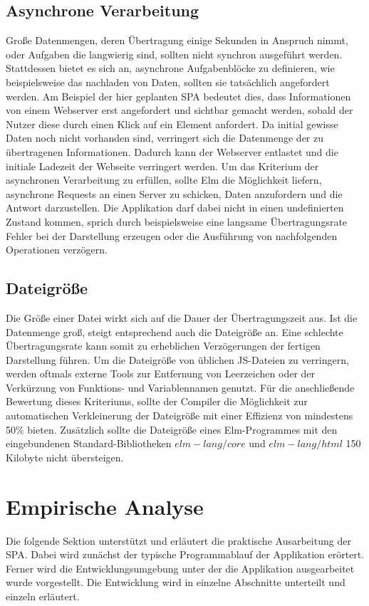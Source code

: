 \subsection{Asynchrone Verarbeitung}
\label{sec:muster_asynchrone_verarbeitung}
Große Datenmengen, deren Übertragung einige Sekunden in Anspruch nimmt, oder Aufgaben die langwierig sind, sollten nicht synchron ausgeführt werden. Stattdessen bietet es sich an, asynchrone Aufgabenblöcke zu definieren, wie beispielsweise das nachladen von Daten, sollten sie tatsächlich angefordert werden. Am Beispiel der hier geplanten \ac{SPA} bedeutet dies, dass Informationen von einem Webserver erst angefordert und sichtbar gemacht werden, sobald der Nutzer diese durch einen Klick auf ein Element anfordert. Da initial gewisse Daten noch nicht vorhanden sind, verringert sich die Datenmenge der zu übertragenen Informationen. Dadurch kann der Webserver entlastet und die initiale Ladezeit der Webseite verringert werden. Um das Kriterium der asynchronen Verarbeitung zu erfüllen, sollte Elm die Möglichkeit liefern, asynchrone Requests an einen Server zu schicken, Daten anzufordern und die Antwort darzustellen. Die Applikation darf dabei nicht in einen undefinierten Zustand kommen, sprich durch beispielsweise eine langsame Übertragungsrate Fehler bei der Darstellung erzeugen oder die Ausführung von nachfolgenden Operationen verzögern.


\subsection{Dateigröße}
\label{sec:muster_dateigroesse}
Die Größe einer Datei wirkt sich auf die Dauer der Übertragungszeit aus. Ist die Datenmenge groß, steigt entsprechend auch die Dateigröße an. Eine schlechte Übertragungsrate kann somit zu erheblichen Verzögerungen der fertigen Darstellung führen. Um die Dateigröße von üblichen \ac{JS}-Dateien zu verringern, werden oftmals externe Tools zur Entfernung von Leerzeichen oder der Verkürzung von Funktions- und Variablennamen genutzt. Für die anschließende Bewertung dieses Kriteriums, sollte der Compiler die Möglichkeit zur automatischen Verkleinerung der Dateigröße mit einer Effizienz von mindestens 50\% bieten. Zusätzlich sollte die Dateigröße eines Elm-Programmes mit den eingebundenen Standard-Bibliotheken $elm-lang/core$ und $elm-lang/html$ 150 Kilobyte nicht übersteigen.

\newpage
\section{Empirische Analyse}
\label{sec:Empirische Analyse}
Die folgende Sektion unterstützt und erläutert die praktische Ausarbeitung der \ac{SPA}. Dabei wird zunächst der typische Programmablauf der Applikation erörtert. Ferner wird die Entwicklungsumgebung unter der die Applikation ausgearbeitet wurde vorgestellt. Die Entwicklung wird in einzelne Abschnitte unterteilt und einzeln erläutert.


